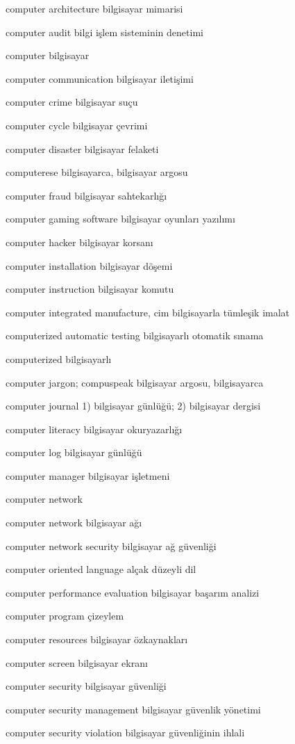 \documentclass[12pt,fleqn]{article}\usepackage{../../common}
\begin{document}
computer architecture bilgisayar mimarisi

computer audit bilgi işlem sisteminin denetimi

computer bilgisayar

computer communication bilgisayar iletişimi

computer crime bilgisayar suçu

computer cycle bilgisayar çevrimi

computer disaster bilgisayar felaketi

computerese bilgisayarca, bilgisayar argosu

computer fraud bilgisayar sahtekarlığı

computer gaming software bilgisayar oyunları yazılımı

computer hacker bilgisayar korsanı

computer installation bilgisayar döşemi

computer instruction bilgisayar komutu

computer integrated manufacture, cim bilgisayarla tümleşik imalat

computerized automatic testing bilgisayarlı otomatik sınama

computerized bilgisayarlı

computer jargon; compuspeak bilgisayar argosu, bilgisayarca

computer journal 1) bilgisayar günlüğü; 2) bilgisayar dergisi

computer literacy bilgisayar okuryazarlığı

computer log bilgisayar günlüğü

computer manager bilgisayar işletmeni

computer network

computer network bilgisayar ağı

computer network security bilgisayar ağ güvenliği

computer oriented language alçak düzeyli dil

computer performance evaluation bilgisayar başarım analizi

computer program çizeylem

computer resources bilgisayar özkaynakları

computer screen bilgisayar ekranı

computer security bilgisayar güvenliği

computer security management bilgisayar güvenlik yönetimi

computer security violation bilgisayar güvenliğinin ihlali
\end{document}
